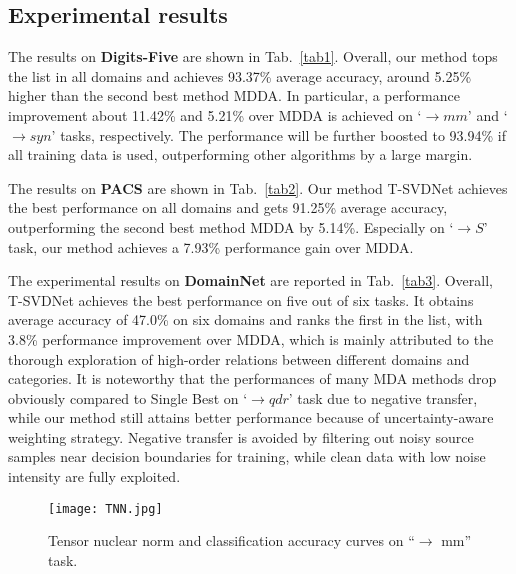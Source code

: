 \documentclass[10pt,twocolumn,letterpaper]{article}
\begin{document}
\subsection{Experimental results}
The results on \textbf{Digits-Five} are shown in Tab.~\ref{tab1}. Overall, our method tops the list in all domains and achieves 93.37\% average accuracy, around 5.25\% higher than the second best method MDDA. In particular, a performance improvement about 11.42\% and 5.21\% over MDDA is achieved on `$\to mm$' and `$\to syn$' tasks, respectively. The performance will be further boosted to 93.94\% if all training data is used, outperforming other algorithms by a large margin.  \par
The results on \textbf{PACS} are shown in Tab.~\ref{tab2}. Our method T-SVDNet achieves the best performance on all domains and gets 91.25\% average accuracy, outperforming the second best method MDDA by 5.14\%. Especially on `$\to S$' task, our method achieves a 7.93\% performance gain over MDDA. \par
The experimental results on \textbf{DomainNet} are reported in Tab.~\ref{tab3}. Overall, T-SVDNet achieves the best performance on five out of six tasks. It obtains average accuracy of 47.0\% on six domains and ranks the first in the list, with 3.8\% performance improvement over MDDA, which is mainly attributed to the thorough exploration of high-order relations between different domains and categories. It is noteworthy that the performances of many MDA methods drop obviously compared to Single Best on `$\to qdr$' task due to negative transfer, while our method still attains better performance because of uncertainty-aware weighting strategy. Negative transfer is avoided by filtering out noisy source samples near decision boundaries for training, while clean data with low noise intensity are fully exploited. \par






\begin{figure}
	\centering
	\texttt{[image: TNN.jpg]}\\
	\caption{Tensor nuclear norm and classification accuracy curves on ``$\to$ mm'' task. }
	\label{fig6}
	\vspace{-1em}
\end{figure}
\end{document}
